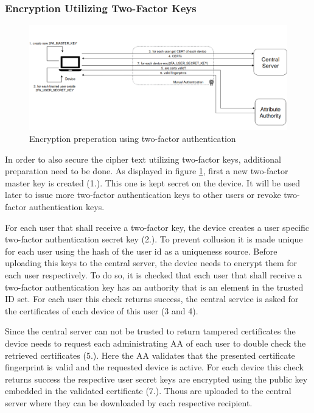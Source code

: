 \subsubsection{Encryption Utilizing Two-Factor Keys}
\label{sec:encryption-utilizing-two-factor-keys}
\begin{figure}[!t]
\centering
    \includegraphics[width=1\linewidth]{img/encryption_2FA.png}
    \caption{Encryption preperation using two-factor authentication}
    \label{fig:tfdacmacs-encrypt-2fa}
\end{figure}

In order to also secure the cipher text utilizing two-factor keys, additional preparation need to be done.  As displayed in figure \ref{fig:tfdacmacs-encrypt-2fa}, first a new two-factor master key is created (1.). This one is kept secret on the device. It will be used later to issue more two-factor authentication keys to other users or revoke two-factor authentication keys. 

For each user that shall receive a two-factor key, the device creates a user specific two-factor authentication secret key (2.). To prevent collusion it is made unique for each user using the hash of the user id as a uniqueness source. Before uploading this keys to the central server, the device needs to encrypt them for each user respectively.  To do so, it is checked that each user that shall receive a two-factor authentication key has an authority that is an element in the trusted ID set. For each user this check returns success, the central service is asked for the certificates of each device of this user (3 and 4).

Since the central server can not be trusted to return tampered certificates the device needs to request each administrating AA of each user to double check the retrieved certificates (5.). Here the AA validates that the presented certificate fingerprint is valid and the requested device is active. For each device this check returns success the respective user secret keys are encrypted using the public key embedded in the validated certificate (7.). Thous are uploaded to the central server where they can be downloaded by each respective recipient. 


